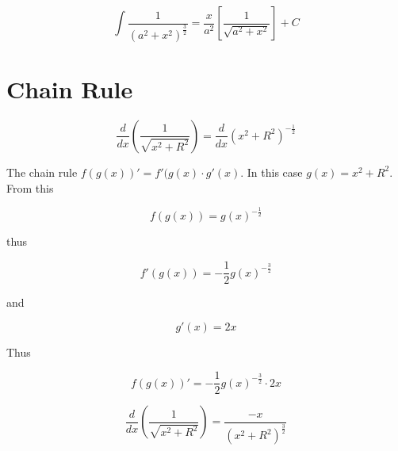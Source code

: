 \documentclass[14pt]{memoir}
\begin{document}
\begin{equation}
\int \frac{1}{(a^2 + x^2)^{\frac{3}{2}}} =  \frac{x}{a^2} [\frac{1}{\sqrt{a^2+x^2}}] + C
\end{equation}





\chapter{Chain Rule}

\begin{equation}
\frac{d}{dx} (\frac{1}{\sqrt{x^2+R^2}}) = \frac{d}{dx} (x^2+R^2)^{-\frac{1}{2}} 
\end{equation}

The chain rule $ f(g(x))' = f'(g(x) \cdot g'(x)$. In this case $g(x) = x^2 + R^2$. From this

\begin{equation}
f(g(x)) = g(x)^{-\frac{1}{2}} 
\end{equation}

thus  

\begin{equation}
f'(g(x)) = -\frac{1}{2} g(x)^{-\frac{3}{2}} 
\end{equation}

and

\begin{equation}
g'(x) = 2x
\end{equation}

Thus

\begin{equation}
f(g(x))' =  -\frac{1}{2} g(x)^{-\frac{3}{2}}  \cdot 2x
\end{equation}

\begin{equation}
\frac{d}{dx} (\frac{1}{\sqrt{x^2+R^2}}) = \frac{-x}{(x^2 + R^2)^\frac{3}{2}}
\end{equation}
\end{document}
